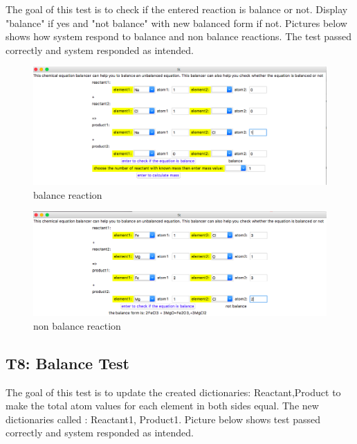 \documentclass[12pt, titlepage]{article}
\begin{document}
The goal of this test is to check if the entered reaction is balance or not. Display "balance" if yes and "not balance" with new balanced form if not. Pictures below shows how system respond to balance and non balance reactions. The test passed correctly and system responded as intended.

\begin{figure}[H]
 \begin{center}
 \includegraphics [width=\textwidth]{balance}
 \caption{\label{ Figure 13:} balance reaction}
 \end{center}
 \end{figure}
 
\begin{figure}[H]
 \begin{center}
 \includegraphics [width=\textwidth]{nonbalance}
 \caption{\label{ Figure 14:} non balance reaction}
 \end{center}
 \end{figure}
  
\subsection{T8: Balance Test}

The goal of this test is to update the created dictionaries: Reactant,Product to make the total atom values for each element in both sides equal. The new dictionaries called : Reactant1, Product1. Picture below shows test passed correctly and system responded as intended.
\end{document}
